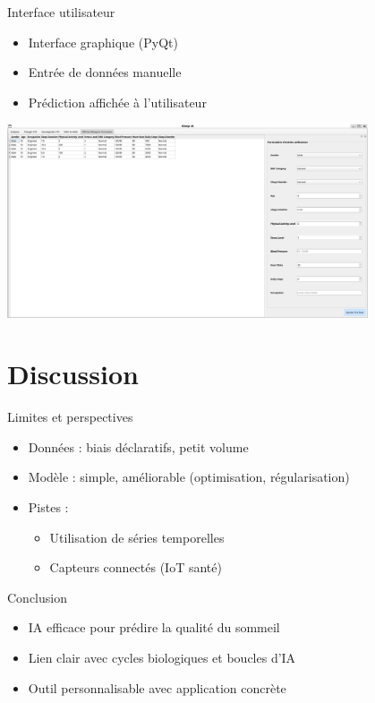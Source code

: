 \documentclass{beamer}
\begin{document}
\begin{frame}{Interface utilisateur}
  \begin{itemize}
    \item Interface graphique (PyQt)
    \item Entrée de données manuelle
    \item Prédiction affichée à l'utilisateur
  \end{itemize}
  \begin{center}
    \includegraphics[width=0.8\textwidth]{screen_UI.png}
  \end{center}
\end{frame}

\section{Discussion}

\begin{frame}{Limites et perspectives}
  \begin{itemize}
    \item Données : biais déclaratifs, petit volume
    \item Modèle : simple, améliorable (optimisation, régularisation)
    \item Pistes :
    \begin{itemize}
      \item Utilisation de séries temporelles
      \item Capteurs connectés (IoT santé)
    \end{itemize}
  \end{itemize}
\end{frame}

\begin{frame}{Conclusion}
  \begin{itemize}
    \item IA efficace pour prédire la qualité du sommeil
    \item Lien clair avec cycles biologiques et boucles d'IA
    \item Outil personnalisable avec application concrète
  \end{itemize}
  \vfill
\end{frame}
\end{document}
